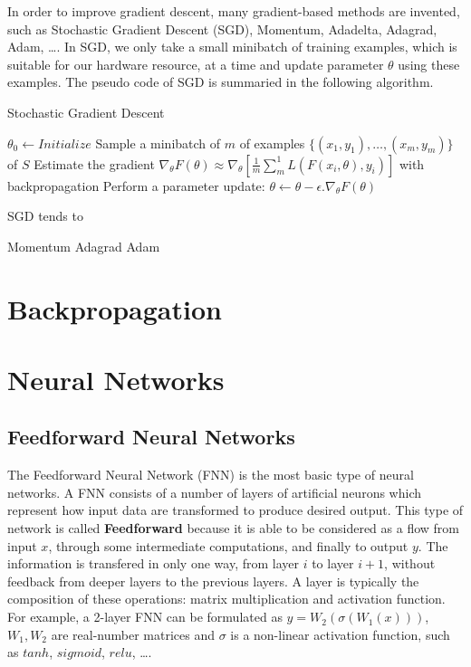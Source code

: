 In order to improve gradient descent, many gradient-based methods are invented, such as Stochastic Gradient Descent (SGD), Momentum, Adadelta, Adagrad, Adam, \dots. In SGD, we only take a small minibatch of training examples, which is suitable for our hardware resource, at a time and update parameter $\displaystyle \theta$ using these examples. The pseudo code of SGD is summaried in the following algorithm.
\begin{algorithm}
    \caption{Stochastic Gradient Descent}
    \begin{algorithmic}[1]
        \State $\theta_0 \gets \textit{Initialize}$
        \Repeat
            \State Sample a minibatch of $\displaystyle m$ of examples $\displaystyle \{(x_1, y_1), \dots, (x_m, y_m)\}$ of $\displaystyle S$
            \State Estimate the gradient $\displaystyle \nabla_{\theta}F(\theta) \approx \nabla_{\theta}[\frac{1}{m}\sum_{m}^{1}{L(F(x_i, \theta),y_i)}]$ with backpropagation
            \State Perform a parameter update: $\displaystyle \theta \gets \theta - \epsilon . \nabla_{\theta}F(\theta)$
    \end{algorithmic}
\end{algorithm}

SGD tends to 

Momentum
Adagrad
Adam

\section{Backpropagation}

\section{Neural Networks}
\subsection{Feedforward Neural Networks}
The Feedforward Neural Network (FNN) is the most basic type of neural networks. A FNN consists of a number of layers of artificial neurons which represent how input data are transformed to produce desired output. This type of network is called \textbf{Feedforward} because it is able to be considered as a flow from input $\displaystyle x$, through some intermediate computations, and finally to output $\displaystyle y$. The information is transfered in only one way, from layer $\displaystyle i$ to layer $\displaystyle i + 1$, without feedback from deeper layers to the previous layers. A layer is typically the composition of these operations: matrix multiplication and activation function. For example, a 2-layer FNN can be formulated as $\displaystyle y = W_2(\sigma(W_1(x)))$, $\displaystyle W_1, W_2$ are real-number matrices and $\displaystyle \sigma$ is a non-linear activation function, such as $\displaystyle tanh$, $\displaystyle sigmoid$, $\displaystyle relu$, \dots.

